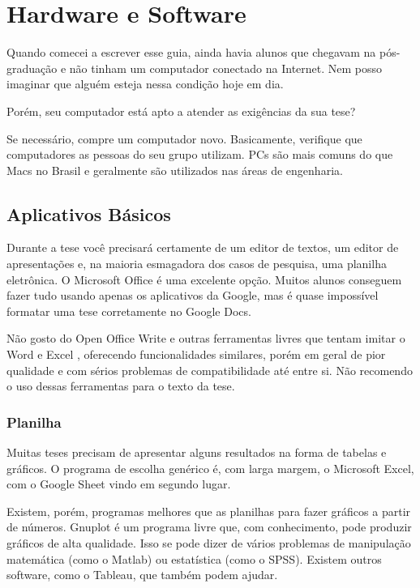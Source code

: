 \chapter{Hardware e Software}

Quando comecei a escrever esse guia, ainda havia alunos que chegavam na pós-graduação e não tinham um computador conectado na Internet. Nem posso imaginar que alguém esteja nessa condição hoje em dia.

Porém, seu computador está apto a atender as exigências da sua tese? 

Se necessário, compre um computador novo. Basicamente, verifique que computadores as pessoas do seu grupo utilizam. PCs são mais comuns do que Macs no Brasil e geralmente são utilizados nas áreas de engenharia.




\section{Aplicativos Básicos}

Durante a tese você precisará certamente de um editor de textos, um editor de apresentações e, na maioria esmagadora dos casos de pesquisa, uma planilha eletrônica. O Microsoft Office é uma excelente opção. Muitos alunos conseguem fazer tudo usando apenas os aplicativos da Google, mas é quase impossível formatar uma tese corretamente no Google Docs.

Não gosto do Open Office Write e outras ferramentas livres que tentam imitar o Word e Excel , oferecendo funcionalidades similares, porém em geral de pior qualidade e com sérios problemas de compatibilidade até entre si. Não recomendo o uso dessas ferramentas para o texto da tese.

\subsection{Planilha}

Muitas teses precisam de apresentar alguns resultados na forma de tabelas e gráficos. O programa de escolha genérico é, com larga margem, o Microsoft Excel, com o Google Sheet vindo em segundo lugar. 


Existem, porém, programas melhores que as planilhas para fazer gráficos a partir de números. Gnuplot é um programa livre que, com conhecimento, pode produzir gráficos de alta qualidade. Isso se pode dizer de vários problemas de manipulação matemática (como o Matlab) ou estatística (como o SPSS).
Existem outros software, como o Tableau, que também podem ajudar.


